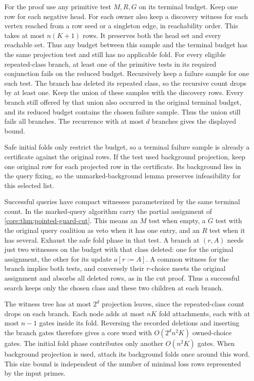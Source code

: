 For the proof use any primitive test $M,R,G$ on its
terminal budget. Keep one row for each negative head.
For each owner also keep a discovery witness for each
vertex reached from a row seed or a singleton edge,
in reachability order. This takes at most $n(K+1)$
rows. It preserves both the head set and every
reachable set. Thus any budget between this sample
and the terminal budget has the same projection
test and still has no applicable fold. For every
eligible repeated-class branch, at least one of the
primitive tests in its required conjunction fails
on the reduced budget. Recursively keep a failure
sample for one such test. The branch has deleted
its repeated class, so the recursive count drops
by at least one. Keep the union of these samples
with the discovery rows. Every branch still offered
by that union also occurred in the original terminal
budget, and its reduced budget contains the chosen
failure sample. Thus the union still fails all
branches. The recurrence with at most $d$ branches
gives the displayed bound.

Safe initial folds only restrict the budget, so a
terminal failure sample is already a certificate
against the original rows. If the test used background
projection, keep one original row for each projected
row in the certificate. Its background lies in the
query fixing, so the unmarked-background lemma
preserves infeasibility for this selected list.

Successful queries have compact witnesses parameterized
by the same terminal count. In the marked-query
algorithm carry the partial assignment of
\cref{core:thm:pointed-guard-cut}. This means an $M$
test when empty, a $G$ test with the original query
coalition as veto when it has one entry, and an $R$
test when it has several. Exhaust the safe fold
phase in that test. A branch at $(r,A)$ needs just
two witnesses on the budget with that class deleted:
one for the original assignment, the other for its
update $a[r:=A]$. A common witness for the branch
implies both tests, and conversely their $r$-choice
meets the original assignment and absorbs all
deleted rows, as in the cut proof. Thus a successful
search keeps only the chosen class and these two
children at each branch.

The witness tree has at most $2^d$ projection leaves,
since the repeated-class count drops on each branch.
Each node adds at most $nK$ fold attachments, each
with at most $n-1$ gates inside its fold. Reversing
the recorded deletions and inserting the branch
gates therefore gives a core word with
$O(2^d n^2 K)$ owned-choice gates. The initial fold
phase contributes only another $O(n^2K)$ gates.
When background projection is used, attach its
background folds once around this word. This size
bound is independent of the number of minimal loss
rows represented by the input primes.

